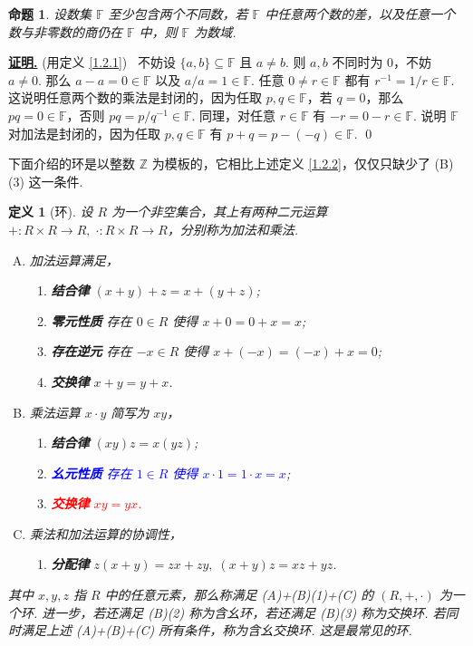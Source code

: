\documentclass[10pt,openany]{article}
\theoremstyle{thmstyle} %
\theoremstyle{defstyle} %
\newtheorem{definition}[theorem]{定义}
\theoremstyle{prostyle} %
\newtheorem{proposition}[theorem]{命题}
\theoremstyle{exastyle}
\theoremstyle{remstyle}
\renewenvironment{proof}[1][证明]{\par\underline{\textbf{#1.}} \;\fangsong}{\qed\par}
\newcommand{\F}{\mathbb{F}}
\begin{document}
\begin{proposition}
	设数集 \( \F \) 至少包含两个不同数，若 \( \F \) 中任意两个数的差，以及任意一个数与非零数的商仍在 \( \F \) 中，则 \( \F \) 为数域.
\end{proposition}

\begin{proof}
	(用定义 \ref{1.2.1}) \ 不妨设 \( \{a,b\} \subseteq \F \) 且 \( a \neq b \). 则 \( a,b \) 不同时为 \( 0 \)，不妨 \( a \neq 0 \). 那么 \( a-a=0 \in \F \) 以及 \( a/a=1 \in \F \). 任意 \( 0 \neq r \in \F \) 都有 \( r^{-1}=1/r \in \F \). 这说明任意两个数的乘法是封闭的，因为任取 \( p,q \in \F \)，若 \( q=0 \)，那么 \( pq=0 \in \F \)，否则 \( pq=p/q^{-1} \in \F \). 同理，对任意 \( r \in \F \) 有 \( -r=0-r \in \F \). 说明 \( \F \) 对加法是封闭的，因为任取 \( p,q \in \F \) 有 \( p+q=p-(-q) \in \F \).
\end{proof}



下面介绍的环是以整数 \( \mathbb{Z} \) 为模板的，它相比上述定义 \ref{1.2.2}，仅仅只缺少了 (B)(3) 这一条件. 

\begin{definition}[环]	\label{1.2.8}
	设 \( R \) 为一个非空集合，其上有两种二元运算 \( +:R \times R \to R , \; \cdot : R \times R \to R \)，分别称为加法和乘法.
	\begin{enumerate}[(A)]
		\item 加法运算满足，
		\begin{enumerate}[(1)]
			\item \textbf{结合律} \( (x+y)+z=x+(y+z) \);
			\item \textbf{零元性质} 存在 \( 0 \in R \) 使得 \( x+0=0+x=x \);
			\item \textbf{存在逆元} 存在 \( -x \in R \) 使得 \( x+(-x)=(-x)+x=0 \);
			\item \textbf{交换律} \( x+y=y+x \).
		\end{enumerate}
		\item 乘法运算 \( x \cdot y \) 简写为 \( xy \)，
		\begin{enumerate}[(1)]
			\item \textbf{结合律} \( (xy)z=x(yz) \);
			\item \textcolor{blue}{\textbf{幺元性质} 存在 \( 1 \in R \) 使得 \( x \cdot 1=1 \cdot x=x \)};
			\item \textcolor{red}{\textbf{交换律} \( xy=yx \).}
		\end{enumerate}
		\item 乘法和加法运算的协调性，
		\begin{enumerate}[(1)]
			\item \textbf{分配律} \( z(x+y)=zx+zy, \; (x+y)z=xz+yz \).
		\end{enumerate}
	\end{enumerate}
	
	其中 \( x,y,z \) 指 \( R \) 中的任意元素，那么称满足 (A)+(B)(1)+(C) 的 \( (R,+, \cdot) \) 为一个环. 进一步，若还满足 (B)(2) 称为含幺环，若还满足 (B)(3) 称为交换环. 若同时满足上述 (A)+(B)+(C) 所有条件，称为含幺交换环. 这是最常见的环. 

\end{definition}
\end{document}
